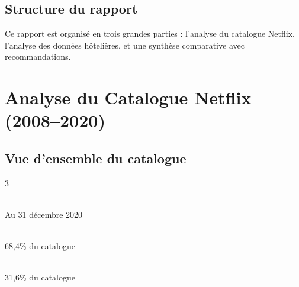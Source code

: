 \documentclass[12pt,a4paper]{article}
\begin{document}
\subsection{Structure du rapport}

Ce rapport est organisé en trois grandes parties : l'analyse du catalogue Netflix, l'analyse des données hôtelières, et une synthèse comparative avec recommandations.

\newpage

\section{Analyse du Catalogue Netflix (2008--2020)}

\subsection{Vue d'ensemble du catalogue}

\vspace{0.5cm}
\begin{multicols}{3}

\begin{tcolorbox}[colback=netflix!8!white, colframe=netflix, rounded corners, center title, title=\textcolor{white}{\textbf{Titres Total}}]
  \vspace{0.2cm}\\
  {\small\color{textgray} Au 31 décembre 2020}
\end{tcolorbox}

\columnbreak

\begin{tcolorbox}[colback=purple!8!white, colframe=purple, rounded corners, center title, title=\textcolor{white}{\textbf{Films}}]
  \vspace{0.2cm}\\
  {\small\color{textgray} 68,4\% du catalogue}
\end{tcolorbox}

\columnbreak

\begin{tcolorbox}[colback=hotel!8!white, colframe=hotel, rounded corners, center title, title=\textcolor{white}{\textbf{Séries TV}}]
  \vspace{0.2cm}\\
  {\small\color{textgray} 31,6\% du catalogue}
\end{tcolorbox}

\end{multicols}
\end{document}
